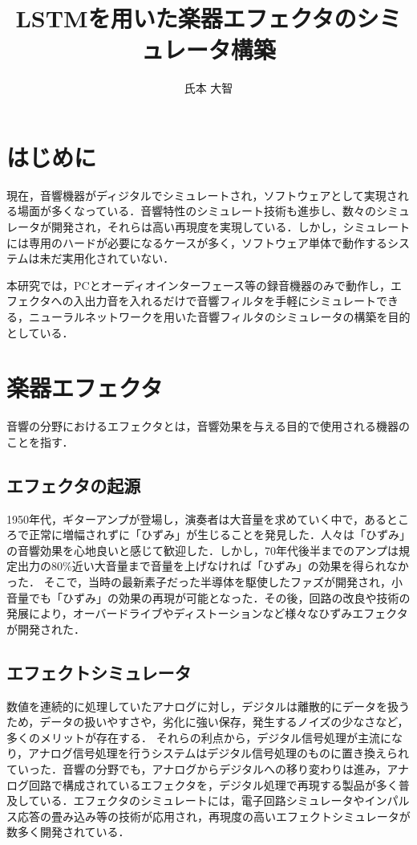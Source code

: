 \documentclass{jreport}		%
\title{LSTMを用いた楽器エフェクタのシミュレータ構築}	%
\author{氏本 大智}		%
\begin{document}
%
\maketitle		%
\tableofcontents	%

\chapter{はじめに}
現在，音響機器がディジタルでシミュレートされ，ソフトウェアとして実現される場面が多くなっている．音響特性のシミュレート技術も進歩し、数々のシミュレータが開発され，それらは高い再現度を実現している．しかし，シミュレートには専用のハードが必要になるケースが多く，ソフトウェア単体で動作するシステムは未だ実用化されていない．

本研究では，PCとオーディオインターフェース等の録音機器のみで動作し，エフェクタへの入出力音を入れるだけで音響フィルタを手軽にシミュレートできる，ニューラルネットワークを用いた音響フィルタのシミュレータの構築を目的としている．

\chapter{楽器エフェクタ}
音響の分野におけるエフェクタとは，音響効果を与える目的で使用される機器のことを指す．

\section{エフェクタの起源}
1950年代，ギターアンプが登場し，演奏者は大音量を求めていく中で，あるところで正常に増幅されずに「ひずみ」が生じることを発見した．人々は「ひずみ」の音響効果を心地良いと感じて歓迎した．しかし，70年代後半までのアンプは規定出力の80\%近い大音量まで音量を上げなければ「ひずみ」の効果を得られなかった．
そこで，当時の最新素子だった半導体を駆使したファズが開発され，小音量でも「ひずみ」の効果の再現が可能となった．その後，回路の改良や技術の発展により，オーバードライブやディストーションなど様々なひずみエフェクタが開発された．

\section{エフェクトシミュレータ}
数値を連続的に処理していたアナログに対し，デジタルは離散的にデータを扱うため，データの扱いやすさや，劣化に強い保存，発生するノイズの少なさなど，多くのメリットが存在する．
それらの利点から，デジタル信号処理が主流になり，アナログ信号処理を行うシステムはデジタル信号処理のものに置き換えられていった．音響の分野でも，アナログからデジタルへの移り変わりは進み，アナログ回路で構成されているエフェクタを，デジタル処理で再現する製品が多く普及している．エフェクタのシミュレートには，電子回路シミュレータやインパルス応答の畳み込み等の技術が応用され，再現度の高いエフェクトシミュレータが数多く開発されている．
\end{document}
